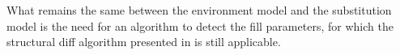 What remains the same between the environment model and the substitution model is the need for an algorithm to detect the fill parameters, for which the structural diff algorithm presented in  is still applicable.

